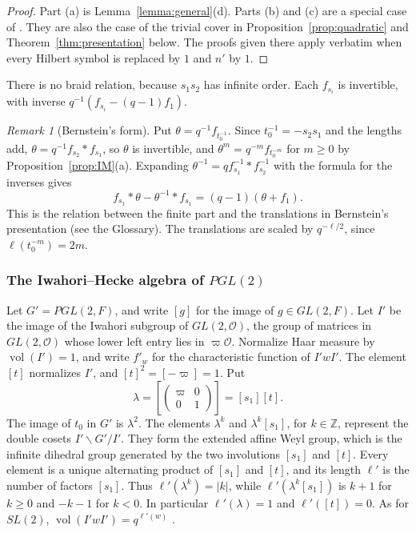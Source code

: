 \documentclass[12pt,letterpaper]{amsart}
\numberwithin{equation}{section}
\theoremstyle{definition}
\theoremstyle{remark}
\newtheorem{remark}[theorem]{Remark}
\DeclareMathOperator{\vol}{vol}
\newcommand{\cO}{\mathcal{O}}
\newcommand{\Z}{\mathbb{Z}}
\newcommand{\mat}[4]{\begin{pmatrix} #1 & #2\\ #3 & #4\end{pmatrix}}
\begin{document}
\begin{proof}
Part (a) is Lemma~\ref{lemma:general}(d). Parts (b) and (c) are a
special case of \cite[\S3]{IM65}. They are also the case of the trivial
cover in Proposition~\ref{prop:quadratic} and
Theorem~\ref{thm:presentation} below. The proofs given there apply
verbatim when every Hilbert symbol is replaced by $1$ and $n'$ by $1$.
\end{proof}

There is no braid relation, because $s_1s_2$ has infinite order. Each
$f_{s_i}$ is invertible, with inverse $q^{-1}(f_{s_i}-(q-1)f_1)$.

\begin{remark}[Bernstein's form]
\label{rem:bernstein}
Put $\theta=q^{-1}f_{t_0^{-1}}$. Since $t_0^{-1}=-s_2s_1$ and the
lengths add, $\theta=q^{-1}f_{s_2}*f_{s_1}$, so $\theta$ is
invertible, and $\theta^m=q^{-m}f_{t_0^{-m}}$ for $m\geq 0$ by
Proposition~\ref{prop:IM}(a). Expanding $\theta^{-1}=qf_{s_1}^{-1}*
f_{s_2}^{-1}$ with the formula for the inverses gives
\[
f_{s_1}*\theta-\theta^{-1}*f_{s_1}=(q-1)(\theta+f_1).
\]
This is the relation between the finite part and the translations in
Bernstein's presentation (see the Glossary). The translations are
scaled by $q^{-\ell/2}$, since $\ell(t_0^{-m})=2m$.
\end{remark}

\subsubsection{The Iwahori--Hecke algebra of \texorpdfstring{$PGL(2)$}{PGL(2)}}
Let $G'=PGL(2,F)$, and write $[g]$ for the image of $g\in GL(2,F)$. Let
$I'$ be the image of the Iwahori subgroup of $GL(2,\cO)$, the group of
matrices in $GL(2,\cO)$ whose lower left entry lies in $\varpi\cO$.
Normalize Haar measure by $\vol(I')=1$, and write $f'_w$ for the
characteristic function of $I'wI'$. The element $[t]$ normalizes $I'$,
and $[t]^2=[-\varpi]=1$. Put
\[
\lambda=\left[\mat{\varpi}001\right]=[s_1][t].
\]
The image of $t_0$ in $G'$ is $\lambda^2$. The elements $\lambda^k$ and
$\lambda^k[s_1]$, for $k\in\Z$, represent the double cosets
$I'\backslash G'/I'$. They form the extended affine Weyl group, which is
the infinite dihedral group generated by the two involutions $[s_1]$
and $[t]$. Every element is a unique alternating product of $[s_1]$ and
$[t]$, and its length $\ell'$ is the number of factors $[s_1]$. Thus
$\ell'(\lambda^k)=|k|$, while $\ell'(\lambda^k[s_1])$ is $k+1$ for
$k\geq 0$ and $-k-1$ for $k<0$. In particular $\ell'(\lambda)=1$ and
$\ell'([t])=0$. As for $SL(2)$, $\vol(I'wI')=q^{\ell'(w)}$
\cite[\S3]{IM65}.
\end{document}
